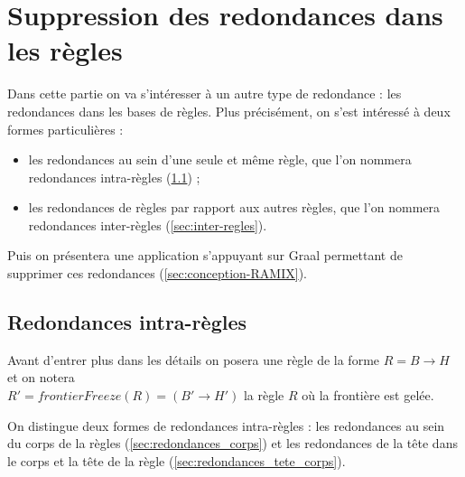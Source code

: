 \section{Suppression des redondances dans les règles}\label{sec:regles}

\par Dans cette partie on va s'intéresser à un autre type de redondance : les redondances dans les bases de règles. Plus précisément, on s'est intéressé à deux formes particulières : 
\begin{itemize}
    \item les redondances au sein d'une seule et même règle, que l'on nommera redondances intra-règles (\ref{sec:intra-regles}) ;
    \item les redondances de règles par rapport aux autres règles, que l'on nommera redondances inter-règles (\ref{sec:inter-regles}).
\end{itemize}
\par Puis on présentera une application s'appuyant sur Graal permettant de supprimer ces redondances (\ref{sec:conception-RAMIX}).


\subsection{Redondances intra-règles}\label{sec:intra-regles}
\par Avant d'entrer plus dans les détails on posera une règle de la forme $R = B \rightarrow H$ et on notera \\ $R' = frontierFreeze(R) = (B' \rightarrow H')$ la règle $R$ où la frontière est gelée. 
\par On distingue deux formes de redondances intra-règles : les redondances au sein du corps de la règles (\ref{sec:redondances_corps}) et les redondances de la tête dans le corps et la tête de la règle (\ref{sec:redondances_tete_corps}).


